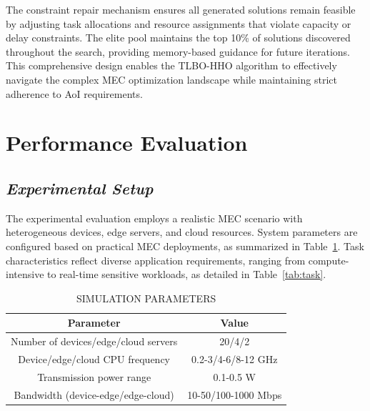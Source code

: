 \documentclass[conference]{IEEEtran}
\begin{document}
The constraint repair mechanism ensures all generated solutions remain feasible by adjusting task allocations and resource assignments that violate capacity or delay constraints. The elite pool maintains the top 10\% of solutions discovered throughout the search, providing memory-based guidance for future iterations. This comprehensive design enables the TLBO-HHO algorithm to effectively navigate the complex MEC optimization landscape while maintaining strict adherence to AoI requirements.

\section{Performance Evaluation}
\subsection{\textit{Experimental Setup}}
The experimental evaluation employs a realistic MEC scenario with heterogeneous devices, edge servers, and cloud resources. System parameters are configured based on practical MEC deployments, as summarized in Table~\ref{tab:system}. Task characteristics reflect diverse application requirements, ranging from compute-intensive to real-time sensitive workloads, as detailed in Table~\ref{tab:task}.

\begin{table}[!t]
\small
\centering
\caption{SIMULATION PARAMETERS}
\label{tab:system}
\begin{tabular}{|c|c|}
\hline
\textbf{Parameter} & \textbf{Value} \\
\hline
Number of devices/edge/cloud servers & 20/4/2 \\
Device/edge/cloud CPU frequency & 0.2-3/4-6/8-12 GHz \\
Transmission power range & 0.1-0.5 W \\
Bandwidth (device-edge/edge-cloud) & 10-50/100-1000 Mbps \\
\hline
\end{tabular}
\end{table}

\begin{table}[!t]
  \scriptsize
  \setlength{\tabcolsep}{4pt}
  \centering
  \caption{Task Type Distribution and Characteristics}
  \label{tab:task}
\end{table}
\end{document}
